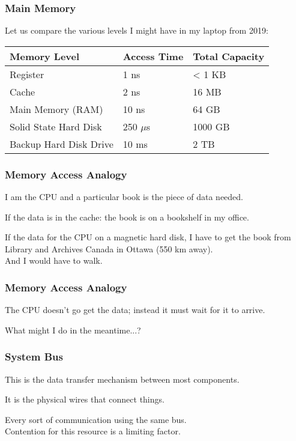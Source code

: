 \begin{frame}
\frametitle{Main Memory}

Let us compare the various levels I might have in my laptop from 2019:

\begin{center}
	\begin{tabular}{l|l|l}
	\textbf{Memory Level} & \textbf{Access Time} & \textbf{Total Capacity} \\ \hline
	Register & 1 ns & < 1 KB \\
	Cache & 2 ns & 16 MB \\
	Main Memory (RAM) & 10 ns & 64 GB \\
	Solid State Hard Disk & 250 $\mu$s & 1000 GB \\
	Backup Hard Disk Drive & 10 ms & 2 TB \\
	\end{tabular}
\end{center}


\end{frame}

\begin{frame}
\frametitle{Memory Access Analogy}
I am the CPU and a particular book is the piece of data needed.

If the data is in the cache: the book is on a bookshelf in my office.

If the data for the CPU on a magnetic hard disk, I have to get the book from Library and Archives Canada in Ottawa (550 km away).\\
\quad And I would have to walk.

\end{frame}

\begin{frame}
\frametitle{Memory Access Analogy}

The CPU doesn't go get the data; instead it must wait for it to arrive.

What might I do in the meantime...?

\end{frame}

\begin{frame}
\frametitle{System Bus}

This is the data transfer mechanism between most components.

It is the physical wires that connect things.

Every sort of communication using the same bus.\\
\quad Contention for this resource is a limiting factor. 

\end{frame}


